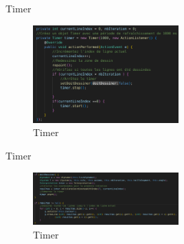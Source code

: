\begin{frame}{Timer}
        \begin{figure}[h!]
      \centering
      \includegraphics[width=0.5\textwidth]{images/timer2.png}
      \caption{Timer}
      \label{fig:3D}
    \end{figure}
\end{frame}
    
\begin{frame}{Timer}
       \begin{figure}[h!]
      \centering
      \includegraphics[width=0.5\textwidth]{images/timer4.png}
      \caption{ Timer}
      \label{fig:3D}
    \end{figure}
\end{frame}